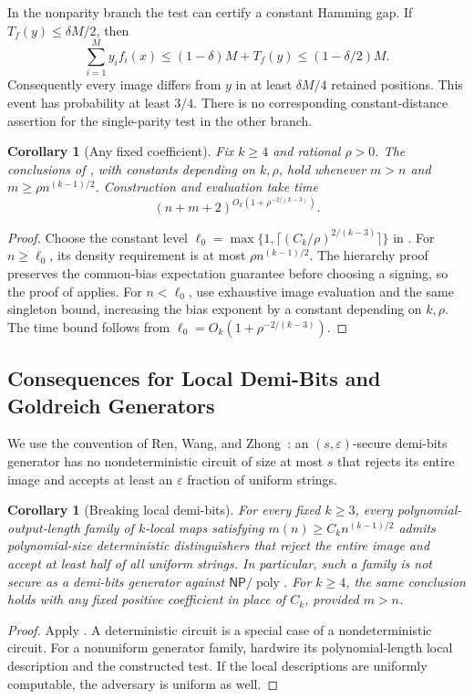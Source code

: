 \documentclass[letterpaper,11pt]{article}
\newtheorem{corollary}[theorem]{Corollary}
\theoremstyle{definition}
\newcommand{\NP}{\mathsf{NP}}
\DeclareMathOperator{\poly}{poly}
\begin{document}
In the nonparity branch the test can certify a constant Hamming gap.
If $T_f(y)\le\delta M/2$, then
\[
 \sum_{i=1}^M y_i f_i(x)
 \le(1-\delta)M+T_f(y)\le(1-\delta/2)M.
\]
Consequently every image differs from $y$ in at least $\delta M/4$
retained positions. This event has probability at least $3/4$.
There is no corresponding constant-distance assertion for the
single-parity test in the other branch.

\begin{corollary}[Any fixed coefficient]\label{cor:prefactor}
Fix $k\ge4$ and rational $\rho>0$. The conclusions of
, with constants depending on $k,\rho$, hold whenever
$m>n$ and $m\ge\rho n^{(k-1)/2}$. Construction and evaluation take time
\[
 (n+m+2)^{O_k(1+\rho^{-2/(k-3)})}.
\]
\end{corollary}
\begin{proof}
Choose the constant level
$\ell_0=\max\{1,\lceil(C_k/\rho)^{2/(k-3)}\rceil\}$ in
. For $n\ge\ell_0$, its density requirement
is at most $\rho n^{(k-1)/2}$. The hierarchy proof preserves the
common-bias expectation guarantee before choosing a signing, so the
proof of  applies. For $n<\ell_0$, use exhaustive
image evaluation and the same singleton bound, increasing the
bias exponent by a constant depending on $k,\rho$.
The time bound follows from $\ell_0=O_k(1+\rho^{-2/(k-3)})$.
\end{proof}

\subsection{Consequences for Local Demi-Bits and Goldreich Generators}

We use the convention of Ren, Wang, and Zhong~\cite[Definition~2.1]{RWZ26}:
an $(s,\varepsilon)$-secure demi-bits generator has no nondeterministic
circuit of size at most $s$ that rejects its entire image and accepts
at least an $\varepsilon$ fraction of uniform strings.

\begin{corollary}[Breaking local demi-bits]\label{cor:demibits}
For every fixed $k\ge3$, every polynomial-output-length family of
$k$-local maps satisfying $m(n)\ge C_kn^{(k-1)/2}$ admits
polynomial-size deterministic distinguishers that reject the entire
image and accept at least half of all uniform strings. In particular,
such a family is not secure as a demi-bits generator against
$\NP/\poly$. For $k\ge4$, the same conclusion holds with any fixed
positive coefficient in place of $C_k$, provided $m>n$.
\end{corollary}
\begin{proof}
Apply . A deterministic circuit is
a special case of a nondeterministic circuit. For a nonuniform
generator family, hardwire its polynomial-length local description
and the constructed test. If the local descriptions are uniformly
computable, the adversary is uniform as well.
\end{proof}
\end{document}
